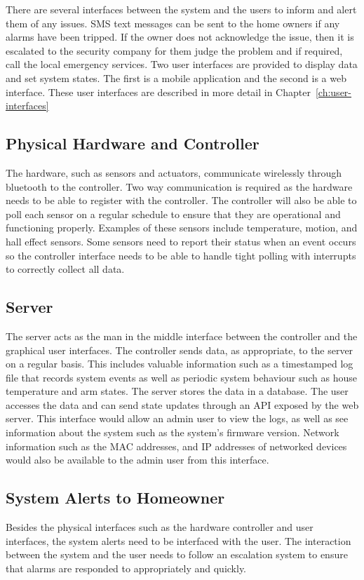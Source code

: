 \documentclass{report}
\begin{document}
There are several interfaces between the system and the users to inform and
alert them of any issues. SMS text messages can be sent to the home owners if
any alarms have been tripped. If the owner does not acknowledge the issue, then
it is escalated to the security company for them judge the problem and if required,
call the local emergency services. Two user interfaces are provided to display
data and set system states. The first is a mobile application and the second is
a web interface. These user interfaces are described in more detail in
Chapter~\ref{ch:user-interfaces}

\subsection{Physical Hardware and Controller}
The hardware, such as sensors and actuators, communicate wirelessly through
bluetooth to the controller. Two way communication is required as the hardware
needs to be able to register with the controller. The controller will also be
able to poll each sensor on a regular schedule to ensure that they are
operational and functioning properly. Examples of these sensors include
temperature, motion, and hall effect sensors. Some sensors need to report their
status when an event occurs so the controller interface needs to be able to
handle tight polling with interrupts to correctly collect all data.

\subsection{Server}
The server acts as the man in the middle interface between the controller and
the graphical user interfaces. The controller sends data, as appropriate, to
the server on a regular basis. This includes valuable information such as
a timestamped log file that records system events as well as periodic system
behaviour such as house temperature and arm states. The server stores the data in a 
database. The user accesses the data and can send state updates through an API 
exposed by the web server. This interface would allow an admin user to view the
logs, as well as see information about the system such as the system's firmware 
version. Network information such as the MAC addresses, and IP addresses of 
networked devices would also be available to the admin user from this interface.

\subsection{System Alerts to Homeowner}
Besides the physical interfaces such as the hardware controller and user
interfaces, the system alerts need to be interfaced with the user. The
interaction between the system and the user needs to follow an escalation
system to ensure that alarms are responded to appropriately and quickly.
\end{document}
